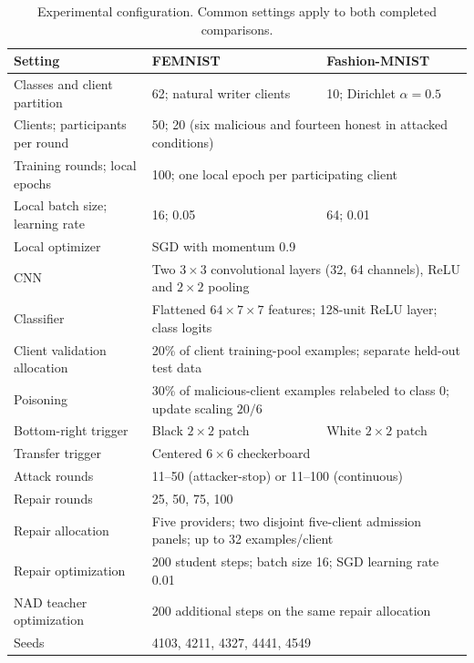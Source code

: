 
\begin{table}[t]
\caption{Experimental configuration. Common settings apply to both completed comparisons.}
\label{tab:configuration}
\centering\begin{tabular}{lll}
\toprule
Setting & FEMNIST & Fashion-MNIST \\
\midrule
Classes and client partition & 62; natural writer clients & 10; Dirichlet $\alpha=0.5$ \\
Clients; participants per round & \multicolumn{2}{l}{50; 20 (six malicious and fourteen honest in attacked conditions)}\\
Training rounds; local epochs & \multicolumn{2}{l}{100; one local epoch per participating client}\\
Local batch size; learning rate & 16; 0.05 & 64; 0.01 \\
Local optimizer & \multicolumn{2}{l}{SGD with momentum 0.9}\\
CNN & \multicolumn{2}{l}{Two $3\times3$ convolutional layers (32, 64 channels), ReLU and $2\times2$ pooling}\\
Classifier & \multicolumn{2}{l}{Flattened $64\times7\times7$ features; 128-unit ReLU layer; class logits}\\
Client validation allocation & \multicolumn{2}{l}{20\% of client training-pool examples; separate held-out test data}\\
Poisoning & \multicolumn{2}{l}{30\% of malicious-client examples relabeled to class 0; update scaling $20/6$}\\
Bottom-right trigger & Black $2\times2$ patch & White $2\times2$ patch \\
Transfer trigger & \multicolumn{2}{l}{Centered $6\times6$ checkerboard}\\
Attack rounds & \multicolumn{2}{l}{11--50 (attacker-stop) or 11--100 (continuous)}\\
Repair rounds & \multicolumn{2}{l}{25, 50, 75, 100}\\
Repair allocation & \multicolumn{2}{l}{Five providers; two disjoint five-client admission panels; up to 32 examples/client}\\
Repair optimization & \multicolumn{2}{l}{200 student steps; batch size 16; SGD learning rate 0.01}\\
NAD teacher optimization & \multicolumn{2}{l}{200 additional steps on the same repair allocation}\\
Seeds & \multicolumn{2}{l}{4103, 4211, 4327, 4441, 4549}\\
\bottomrule\end{tabular}
\end{table}

